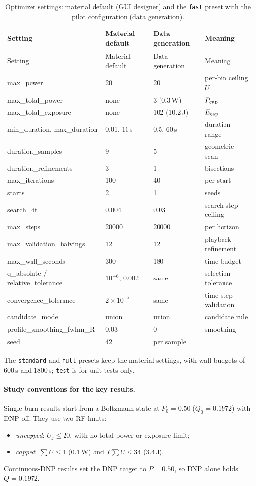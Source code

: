 \documentclass[11pt]{article}
\newcommand{\code}[1]{\texttt{#1}}
\begin{document}
\begin{longtable}{>{\ttfamily}L{0.29\textwidth} L{0.15\textwidth} L{0.15\textwidth} L{0.29\textwidth}}
\caption{Optimizer settings: material default (GUI designer) and the \code{fast} preset with the
pilot configuration (data generation).}\label{tab:optsettings}\\
\toprule
Setting & Material default & Data generation & Meaning\\
\midrule
\endfirsthead
\toprule
Setting & Material default & Data generation & Meaning\\
\midrule
\endhead
max\_power & 20 & 20 & per-bin ceiling \(\bar U\)\\
max\_total\_power & none & 3 (0.3\,W) & \(P_{\rm cap}\)\\
max\_total\_exposure & none & 102 (10.2\,J) & \(E_{\rm cap}\)\\
min\_duration, max\_duration & 0.01, 10\,s & 0.5, 60\,s & duration range\\
duration\_samples & 9 & 5 & geometric scan\\
duration\_refinements & 3 & 1 & bisections\\
max\_iterations & 100 & 40 & per start\\
starts & 2 & 1 & seeds\\
search\_dt & 0.004 & 0.03 & search step ceiling\\
max\_steps & 20000 & 20000 & per horizon\\
max\_validation\_halvings & 12 & 12 & playback refinement\\
max\_wall\_seconds & 300 & 180 & time budget\\
q\_absolute / relative\_tolerance & \(10^{-6}\), 0.002 & same & selection tolerance\\
convergence\_tolerance & \(2\times10^{-5}\) & same & time-step validation\\
candidate\_mode & union & union & candidate rule\\
profile\_smoothing\_fwhm\_R & 0.03 & 0 & smoothing\\
seed & 42 & per sample & \\
\bottomrule
\end{longtable}

\noindent The \code{standard} and \code{full} presets keep the material settings, with wall budgets
of 600\,s and 1800\,s; \code{test} is for unit tests only.

\paragraph{Study conventions for the key results.}
Single-burn results start from a Boltzmann state at \(P_0=0.50\) (\(Q_0=0.1972\)) with DNP off.
They use two RF limits:
\begin{itemize}
\item \emph{uncapped}: \(U_j\le20\), with no total power or exposure limit;
\item \emph{capped}: \(\sum U\le1\) (0.1\,W) and \(T\sum U\le34\) (3.4\,J).
\end{itemize}
Continuous-DNP results set the DNP target to \(P=0.50\), so DNP alone holds \(Q=0.1972\).
\end{document}
